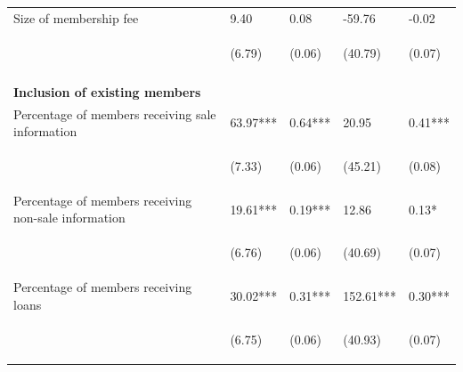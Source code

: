 \documentclass[11pt]{article}
\begin{document}
\begin{table}[H]
{\begin{tabularx}{1.5\linewidth}{lllll}
\noalign{\smallskip}Size of membership fee & 9.40 & 0.08 & -59.76 & -0.02\\
 & \begin{footnotesize}(6.79)\end{footnotesize} & \begin{footnotesize}(0.06)\end{footnotesize} & \begin{footnotesize}(40.79)\end{footnotesize} & \begin{footnotesize}(0.07)\end{footnotesize}\\ \\

\textbf{Inclusion of existing members} & & & & \\
\noalign{\smallskip}Percentage of members receiving sale information & 63.97*** & 0.64*** & 20.95 & 0.41***\\
 & \begin{footnotesize}(7.33)\end{footnotesize} & \begin{footnotesize}(0.06)\end{footnotesize} & \begin{footnotesize}(45.21)\end{footnotesize} & \begin{footnotesize}(0.08)\end{footnotesize}\\
\noalign{\smallskip}Percentage of members receiving non-sale information & 19.61*** & 0.19*** & 12.86 & 0.13*\\
 & \begin{footnotesize}(6.76)\end{footnotesize} & \begin{footnotesize}(0.06)\end{footnotesize} & \begin{footnotesize}(40.69)\end{footnotesize} & \begin{footnotesize}(0.07)\end{footnotesize}\\
\noalign{\smallskip}Percentage of members receiving loans & 30.02*** & 0.31*** & 152.61*** & 0.30***\\
 & \begin{footnotesize}(6.75)\end{footnotesize} & \begin{footnotesize}(0.06)\end{footnotesize} & \begin{footnotesize}(40.93)\end{footnotesize} & \begin{footnotesize}(0.07)\end{footnotesize}\\

\end{tabularx}}
\end{table}
\end{document}
